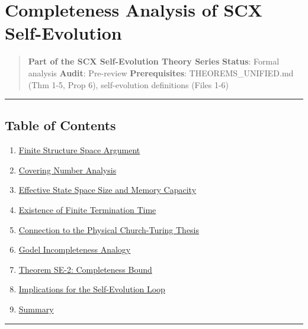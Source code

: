 \documentclass[
  12pt,
]{article}
\author{SCX}
\date{2026}
\providecommand{\tightlist}{%
  \setlength{\itemsep}{0pt}\setlength{\parskip}{0pt}}
\begin{document}
\section{Completeness Analysis of SCX
Self-Evolution}\label{completeness-analysis-of-scx-self-evolution}

\begin{quote}
\textbf{Part of the SCX Self-Evolution Theory Series} \textbf{Status}:
Formal analysis \textbar{} \textbf{Audit}: Pre-review
\textbf{Prerequisites}: THEOREMS\_UNIFIED.md (Thm 1-5, Prop 6),
self-evolution definitions (Files 1-6)
\end{quote}

\begin{center}\rule{0.5\linewidth}{0.5pt}\end{center}

\subsection{Table of Contents}\label{table-of-contents}

\begin{enumerate}
\def\labelenumi{\arabic{enumi}.}
\tightlist
\item
  \hyperref[1-finite-structure-space-argument]{Finite Structure Space
  Argument}
\item
  \hyperref[2-covering-number-analysis]{Covering Number Analysis}
\item
  \hyperref[3-effective-state-space-size-and-memory-capacity]{Effective
  State Space Size and Memory Capacity}
\item
  \hyperref[4-existence-of-finite-termination-time]{Existence of Finite
  Termination Time}
\item
  \hyperref[5-connection-to-the-physical-church-turing-thesis]{Connection
  to the Physical Church-Turing Thesis}
\item
  \hyperref[6-godel-incompleteness-analogy]{Godel Incompleteness
  Analogy}
\item
  \hyperref[7-theorem-se-2-completeness-bound]{Theorem SE-2:
  Completeness Bound}
\item
  \hyperref[8-implications-for-the-self-evolution-loop]{Implications for
  the Self-Evolution Loop}
\item
  \hyperref[9-summary]{Summary}
\end{enumerate}

\begin{center}\rule{0.5\linewidth}{0.5pt}\end{center}
\end{document}
